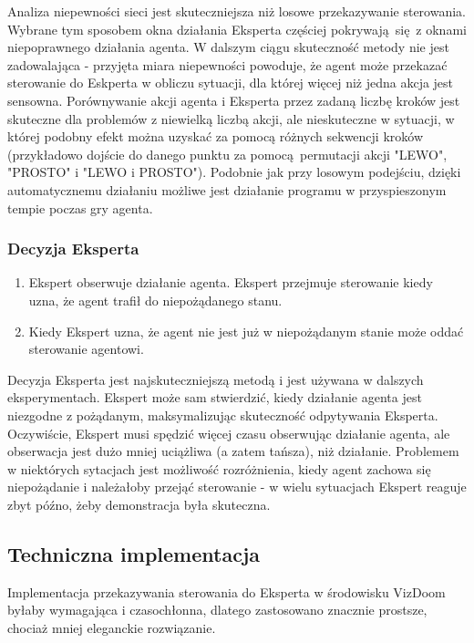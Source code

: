 Analiza niepewności sieci jest skuteczniejsza niż losowe przekazywanie sterowania. Wybrane tym sposobem okna działania Eksperta częściej pokrywają się z oknami niepoprawnego działania agenta. W dalszym ciągu skuteczność metody nie jest zadowalająca - przyjęta miara niepewności powoduje, że agent może przekazać sterowanie do Eskperta w obliczu sytuacji, dla której więcej niż jedna akcja jest sensowna. Porównywanie akcji agenta i Eksperta przez zadaną liczbę kroków jest skuteczne dla problemów z niewielką liczbą akcji, ale nieskuteczne w sytuacji, w której podobny efekt można uzyskać za pomocą różnych sekwencji kroków (przykładowo dojście do danego punktu za pomocą permutacji akcji "LEWO", "PROSTO" i "LEWO i PROSTO"). Podobnie jak przy losowym podejściu, dzięki automatycznemu działaniu możliwe jest działanie programu w przyspieszonym tempie poczas gry agenta.

\subsubsection{Decyzja Eksperta}\label{expert_call}
\begin{enumerate}
\item Ekspert obserwuje działanie agenta. Ekspert przejmuje sterowanie kiedy uzna, że agent trafił do niepożądanego stanu.
\item Kiedy Ekspert uzna, że agent nie jest już w niepożądanym stanie może oddać sterowanie agentowi.
\end{enumerate}

Decyzja Eksperta jest najskuteczniejszą metodą i jest używana w dalszych eksperymentach. Ekspert może sam stwierdzić, kiedy działanie agenta jest niezgodne z pożądanym, maksymalizując skuteczność odpytywania Eksperta. Oczywiście, Ekspert musi spędzić więcej czasu obserwując działanie agenta, ale obserwacja jest dużo mniej uciążliwa (a zatem tańsza), niż działanie. Problemem w niektórych sytacjach jest możliwość rozróżnienia, kiedy agent zachowa się niepożądanie i należałoby przejąć sterowanie - w wielu sytuacjach Ekspert reaguje zbyt późno, żeby demonstracja była skuteczna.

\subsection{Techniczna implementacja}

Implementacja przekazywania sterowania do Eksperta w środowisku VizDoom byłaby wymagająca i czasochłonna, dlatego zastosowano znacznie prostsze, chociaż mniej eleganckie rozwiązanie.

